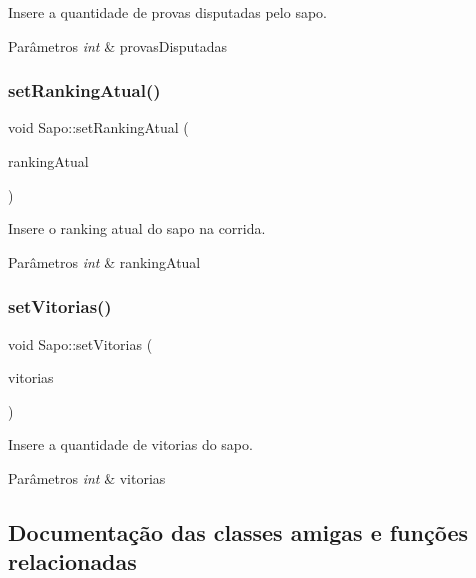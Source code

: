 Insere a quantidade de provas disputadas pelo sapo. 


\begin{DoxyParams}{Parâmetros}
{\em int} & provas\+Disputadas \\
\hline
\end{DoxyParams}
\mbox{\label{classSapo_a6447322ddb64e1cb5588bbaea29c5181}} 
\subsubsection{\texorpdfstring{set\+Ranking\+Atual()}{setRankingAtual()}}
{\footnotesize\ttfamily void Sapo\+::set\+Ranking\+Atual (\begin{DoxyParamCaption}\item[{int}]{ranking\+Atual }\end{DoxyParamCaption})}



Insere o ranking atual do sapo na corrida. 


\begin{DoxyParams}{Parâmetros}
{\em int} & ranking\+Atual \\
\hline
\end{DoxyParams}
\mbox{\label{classSapo_ad17d6f03b81c069a3b7e09a42005f1d2}} 
\subsubsection{\texorpdfstring{set\+Vitorias()}{setVitorias()}}
{\footnotesize\ttfamily void Sapo\+::set\+Vitorias (\begin{DoxyParamCaption}\item[{int}]{vitorias }\end{DoxyParamCaption})}



Insere a quantidade de vitorias do sapo. 


\begin{DoxyParams}{Parâmetros}
{\em int} & vitorias \\
\hline
\end{DoxyParams}


\subsection{Documentação das classes amigas e funções relacionadas}
\mbox{\label{classSapo_a295992e9cef7ed41031bd2a0a9e70646}} 
